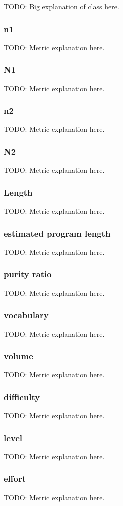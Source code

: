 TODO: Big explanation of class here.

\subsubsection{n1}

TODO: Metric explanation here.

\subsubsection{N1}
TODO: Metric explanation here.
\subsubsection{n2}
TODO: Metric explanation here.
\subsubsection{N2}
TODO: Metric explanation here.
\subsubsection{Length}
TODO: Metric explanation here.
\subsubsection{estimated program length}
TODO: Metric explanation here.
\subsubsection{purity ratio}
TODO: Metric explanation here.
\subsubsection{vocabulary}
TODO: Metric explanation here.
\subsubsection{volume}
TODO: Metric explanation here.
\subsubsection{difficulty}
TODO: Metric explanation here.
\subsubsection{level}
TODO: Metric explanation here.
\subsubsection{effort}
TODO: Metric explanation here.
